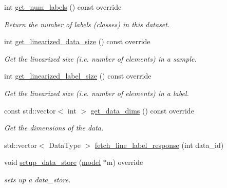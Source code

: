 \begin{DoxyCompactItemize}
\item 
int \hyperlink{classlbann_1_1csv__reader_a435acd73d8ef4549fb398d006f26c01c}{get\+\_\+num\+\_\+labels} () const override
\begin{DoxyCompactList}\small\item\em Return the number of labels (classes) in this dataset. \end{DoxyCompactList}\item 
int \hyperlink{classlbann_1_1csv__reader_aa1121a406e7af9e97d82e5a945b3b957}{get\+\_\+linearized\+\_\+data\+\_\+size} () const override
\begin{DoxyCompactList}\small\item\em Get the linearized size (i.\+e. number of elements) in a sample. \end{DoxyCompactList}\item 
int \hyperlink{classlbann_1_1csv__reader_a2cff8a7ea0fbafebbab71a7731387447}{get\+\_\+linearized\+\_\+label\+\_\+size} () const override
\begin{DoxyCompactList}\small\item\em Get the linearized size (i.\+e. number of elements) in a label. \end{DoxyCompactList}\item 
const std\+::vector$<$ int $>$ \hyperlink{classlbann_1_1csv__reader_a6fab46f562936d43d19e0eaacf8b72c0}{get\+\_\+data\+\_\+dims} () const override
\begin{DoxyCompactList}\small\item\em Get the dimensions of the data. \end{DoxyCompactList}\item 
std\+::vector$<$ Data\+Type $>$ \hyperlink{classlbann_1_1csv__reader_ae00ba61c2b9db1595ff62ab61a218cfb}{fetch\+\_\+line\+\_\+label\+\_\+response} (int data\+\_\+id)
\item 
void \hyperlink{classlbann_1_1csv__reader_a19175c31963be64ea602d49cfb37bc68}{setup\+\_\+data\+\_\+store} (\hyperlink{classlbann_1_1model}{model} $\ast$m) override
\begin{DoxyCompactList}\small\item\em sets up a data\+\_\+store. \end{DoxyCompactList}\end{DoxyCompactItemize}
